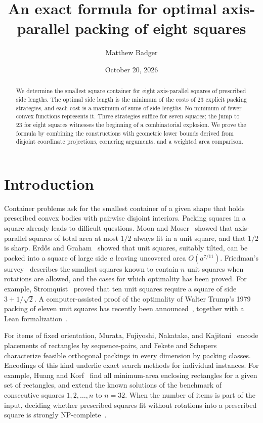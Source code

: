 \documentclass[12pt]{amsart}
\title[Optimal packing of eight squares]{An exact formula for optimal axis-parallel packing of eight squares}
\date{October 20, 2026}
\author{Matthew Badger}
\theoremstyle{definition}
\theoremstyle{remark}
\numberwithin{equation}{section}
\numberwithin{figure}{section}
\numberwithin{table}{section}
\begin{document}
\begin{abstract}
We determine the smallest square container for eight axis-parallel squares
of prescribed side lengths. The optimal side length is the minimum of the
costs of 23 explicit packing strategies, and each cost is a maximum of sums
of side lengths. No minimum of fewer convex functions represents it. Three
strategies suffice for seven squares; the jump to 23 for eight squares
witnesses the beginning of a combinatorial explosion. We prove the formula by combining
the constructions with geometric lower bounds derived from disjoint
coordinate projections, cornering arguments, and a weighted area comparison.
\end{abstract}

\maketitle

\setcounter{tocdepth}{1}
\tableofcontents

\section{Introduction}\label{sec:introduction}
Container problems ask for the smallest container of a given shape that
holds prescribed convex bodies with pairwise disjoint interiors. Packing squares in a
square already leads to difficult questions. Moon and Moser~\cite{MoonMoser67}
showed that axis-parallel squares of total area at most $1/2$ always fit in a
unit square, and that $1/2$ is sharp.
Erd\H{o}s and Graham~\cite{ErdosGraham75} showed that unit squares, suitably
tilted, can be packed into a square of large side $a$ leaving uncovered area
$O(a^{7/11})$. Friedman's survey~\cite{Friedman09} describes the smallest squares
known to contain $n$ unit squares when rotations are allowed, and the
cases for which optimality has been proved. For example,
Stromquist~\cite{Stromquist03} proved that ten unit squares require a square
of side $3+1/\sqrt2$. A computer-assisted proof of the optimality of Walter
Trump's 1979 packing of eleven unit squares has recently been
announced~\cite{ElevenSquares26}, together with a Lean
formalization~\cite{ElevenSquaresFormalized26}.

For items of fixed orientation, Murata, Fujiyoshi, Nakatake, and
Kajitani~\cite{Murata96} encode placements of rectangles by sequence-pairs,
and Fekete and Schepers~\cite{FeketeSchepers04} characterize feasible
orthogonal packings in every dimension by packing classes. Encodings of this
kind underlie exact search methods for individual instances. For example,
Huang and Korf~\cite{HuangKorf13} find all minimum-area enclosing rectangles
for a given set of rectangles, and extend the known solutions of the
benchmark of consecutive squares $1,2,\ldots,n$ to $n=32$.
When the number of items is part of the input, deciding whether prescribed
squares fit without rotations into a prescribed square is strongly
NP-complete~\cite{Leung90}.
\end{document}
